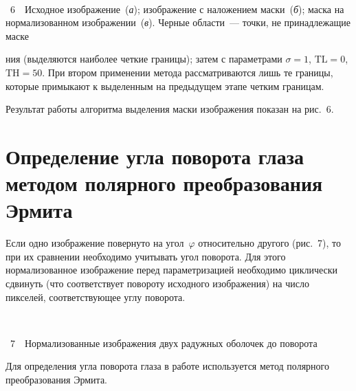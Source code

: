 \begin{multicols}{2}
\begin{center} %
\mbox{%
\epsfxsize=78mm
}
\end{center}
\vspace*{3pt}
{{\figurename~6}\ \ \small{Исходное изображение~(\textit{а}); изображение с наложением маски~(\textit{б}); 
маска на нормализованном изображении~(\textit{в}). Черные области~--- точки, не 
принадлежащие маске}}


\bigskip
\addtocounter{figure}{1}


\noindent
ния (выделяются 
наиболее четкие границы); затем с параметрами $\sigma = 1$, $\mathrm{TL} = 0$, $\mathrm{TH} = 50$. 
При втором применении метода рассматриваются лишь те границы, которые 
примыкают к выделенным на предыдущем этапе четким границам.

Результат работы алгоритма выделения маски изображения показан на рис.~6.



\section{Определение угла поворота глаза методом полярного 
преобразования Эрмита}

Если одно изображение повернуто на угол~$\varphi$ относительно другого 
(рис.~7), то при их сравнении необходимо учитывать угол поворота. Для этого 
нормализованное изображение перед параметризацией необходимо циклически 
сдвинуть (что соответствует повороту исходного изображения) на число пикселей, 
соответствующее углу поворота.

\begin{center} %
\vspace*{6pt}
\mbox{%
\epsfxsize=78mm
}
\end{center}
{{\figurename~7}\ \ \small{Нормализованные изображения двух радужных оболочек до поворота}}


\bigskip
\addtocounter{figure}{1}

Для определения угла поворота глаза в работе используется метод полярного 
преобразования Эрмита.


\end{multicols}
